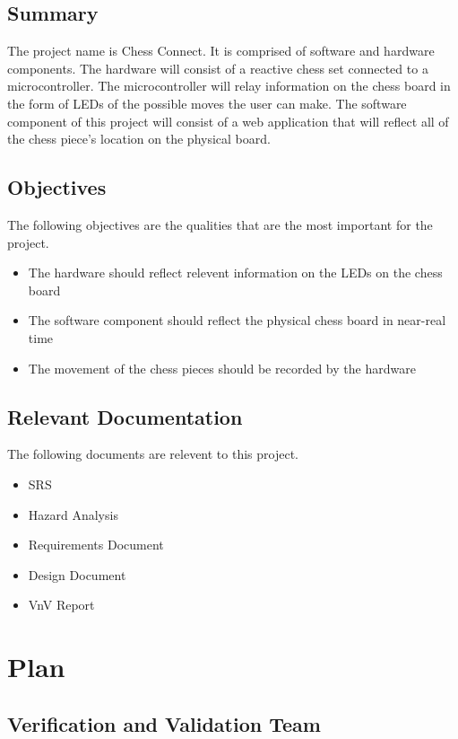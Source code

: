 \documentclass[12pt, titlepage]{article}
\begin{document}
\subsection{Summary}
The project name is Chess Connect. It is comprised of software and hardware components. The hardware will consist of a reactive chess set 
connected to a microcontroller. The microcontroller will relay information on the chess board in the form of LEDs of the possible moves the user can make.
The software component of this project will consist of a web application that will reflect all of the chess piece's location on the physical board.

\subsection{Objectives}
The following objectives are the qualities that are the most important for the project.
\begin{itemize}
  \item The hardware should reflect relevent information on the LEDs on the chess board
  \item The software component should reflect the physical chess board in near-real time
  \item The movement of the chess pieces should be recorded by the hardware
\end{itemize}

\subsection{Relevant Documentation}
The following documents are relevent to this project.
\begin{itemize}
  \item SRS
  \item Hazard Analysis
  \item Requirements Document
  \item Design Document
  \item VnV Report
\end{itemize}

\section{Plan}


\subsection{Verification and Validation Team}
\end{document}
